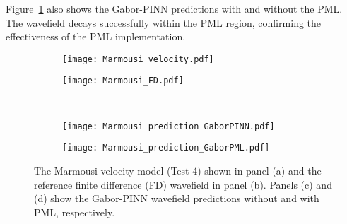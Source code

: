 \documentclass[authoryear, preprint, 12pt]{elsarticle}
\begin{document}
Figure~\ref{fig:Marmousi_prediction} also shows the Gabor-PINN predictions with and without the PML. The wavefield decays successfully within the PML region, confirming the effectiveness of the PML implementation.


	
		\begin{figure}[h]
		\centering
		\begin{subfigure}[b]{0.32\textwidth}
			\texttt{[image: Marmousi\_velocity.pdf]}
		\end{subfigure}
		\begin{subfigure}[b]{0.32\textwidth}
			\texttt{[image: Marmousi\_FD.pdf]}
		\end{subfigure}
		\\
		\begin{subfigure}[b]{0.32\textwidth}
			\texttt{[image: Marmousi\_prediction\_GaborPINN.pdf]}
		\end{subfigure}
		\begin{subfigure}[b]{0.32\textwidth}
			\texttt{[image: Marmousi\_prediction\_GaborPML.pdf]}
		\end{subfigure}
		
\caption{The Marmousi velocity model (Test 4) shown in panel (a) and the reference finite difference (FD) wavefield in panel (b). Panels (c) and (d) show the Gabor-PINN wavefield predictions without and with PML, respectively.}
\label{fig:Marmousi_prediction}
	\end{figure}
	
\end{document}
